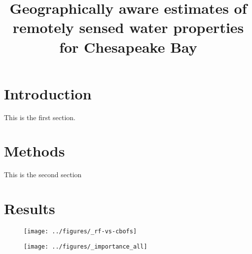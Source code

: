 \documentclass{article}
\title{Geographically aware estimates of remotely sensed water properties for Chesapeake Bay}
\author{}
\date{}
\begin{document}
\maketitle
\section{Introduction}

This is the first section.
\lipsum

\section{Methods}
This is the second section

\section{Results}

\begin{figure}[h!]
    \begin{center}
          \texttt{[image: ../figures/\_rf-vs-cbofs]}
    \end{center}    
\end{figure}

\begin{figure}[h!]
    \begin{center}
          \texttt{[image: ../figures/\_importance\_all]}
    \end{center}    
\end{figure}
\end{document}
